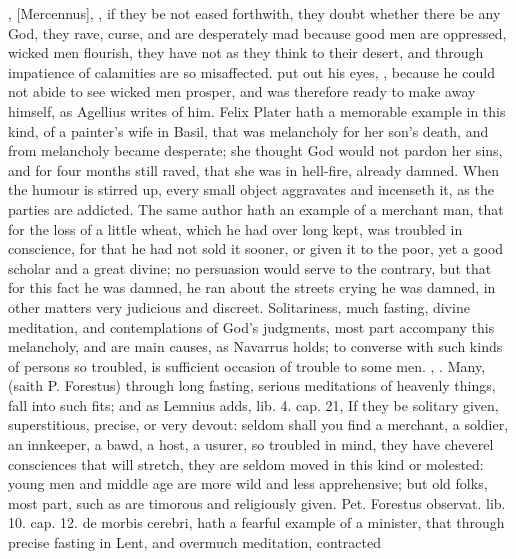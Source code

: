 {, [Mercennus], , if
they be not eased forthwith, they doubt whether there be any God, they
rave, curse, and are desperately mad because good men are oppressed,
wicked men flourish, they have not as they think to their desert, and
through impatience of calamities are so misaffected. \Democritus{} put out
his eyes, , because he
could not abide to see wicked men prosper, and was therefore ready to
make away himself, as Agellius writes of him. Felix Plater hath a
memorable example in this kind, of a painter's wife in Basil, that was
melancholy for her son's death, and from melancholy became desperate;
she thought God would not pardon her sins, and for four months
still raved, that she was in hell-fire, already damned. When the humour
is stirred up, every small object aggravates and incenseth it, as the
parties are addicted. The same author hath an example of a
merchant man, that for the loss of a little wheat, which he had over
long kept, was troubled in conscience, for that he had not sold it
sooner, or given it to the poor, yet a good scholar and a great divine;
no persuasion would serve to the contrary, but that for this fact he
was damned, he ran about the streets crying he was damned, in other matters
very judicious and discreet. Solitariness, much fasting, divine meditation, and
contemplations of God's judgments, most part accompany this melancholy, and are
main causes, as Navarrus holds; to converse with such
kinds of persons so troubled, is sufficient occasion of trouble to some men.
, \etc{}. Many, (saith P. Forestus) through
long fasting, serious meditations of heavenly things, fall into such fits;
and as Lemnius adds, \textlatin{lib. 4. cap. 21,} If they be solitary given,
superstitious, precise, or very devout: seldom shall you find a
merchant, a soldier, an innkeeper, a bawd, a host, a usurer, so
troubled in mind, they have cheverel consciences that will stretch,
they are seldom moved in this kind or molested: young men and middle
age are more wild and less apprehensive; but old folks, most part, such
as are timorous and religiously given. Pet. Forestus \textlatin{observat. lib. 10.
cap. 12. de morbis cerebri}, hath a fearful example of a minister, that
through precise fasting in Lent, and overmuch meditation, contracted
}

